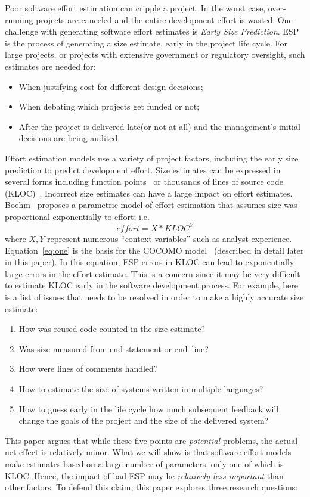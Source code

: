 \documentclass[final,twocolumn]{elsarticle}
\newcommand{\bi}{\begin{itemize}[leftmargin=0.4cm]}
\newcommand{\ei}{\end{itemize}}
\newcommand{\be}{\begin{enumerate}}
\newcommand{\ee}{\end{enumerate}}
\newcommand{\eq}[1]{Equation~\ref{eq:#1}}
\theoremstyle{break}
\begin{document}
Poor software effort estimation can cripple a project.
In
the worst case, over-running projects are canceled and
the entire development effort is wasted.
One challenge with generating software effort estimates
is  {\em Early Size Prediction}. ESP is the process of generating a size
estimate, early in the project life cycle. For large projects, or projects
with extensive government or regulatory oversight, such estimates are needed for:
\bi
\item When justifying cost for different design decisions; 
\item When debating which projects get funded or not;
\item After the project is delivered late(or not at all) and the management's initial decisions are being audited.
\ei
Effort estimation models use a variety of project factors, including the early size prediction
to predict development effort.
Size estimates can be expressed in several
forms including function points~\cite{Albrecht83} or  thousands of lines of
source code (KLOC)~\cite{boehm81}.
Incorrect size estimates can have a large impact on effort estimates. 
Boehm~\cite{boehm81} proposes a parametric model of effort estimation that
  assumes size was proportional exponentially to effort; i.e.
  \begin{equation}\label{eq:one}
    \mathit{effort} = \mathit{X*KLOC}^Y
    \end{equation}
  where $X,Y$ represent numerous ``context variables'' such as analyst experience.
  \eq{one} is the basis for the COCOMO model~\cite{boehm81,boehm00b}  (described in detail later in this paper).
  In this equation, ESP errors in KLOC can lead to exponentially large errors
  in the  effort estimate.
  This is a concern since it may be very difficult to estimate KLOC
  early in the software development process.
  For example, here is a list of issues that needs to be resolved in order
  to make a highly accurate size estimate:
  \be
\item How was reused code counted in the size estimate?
\item  Was size measured from end-statement or end--line?
\item How were lines of comments handled?
\item How to estimate the size of systems written in multiple languages?
\item
  How to guess early in the life cycle
  how much subsequent  feedback will change
  the goals of the project and the size of the delivered system?
  \ee
  This paper argues that while these five
  points are {\em potential} problems, the actual
  net effect is relatively minor.
What we will show is that software effort models make estimates based on a large number of parameters, only one 
of which is KLOC. 
Hence, the impact of bad ESP  may be 
{\em relatively less important} than other factors.
To defend this claim, this paper explores three research questions:
\end{document}
